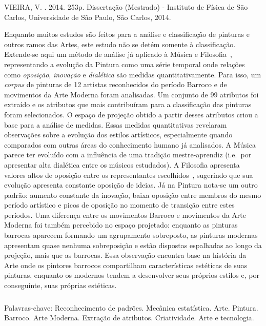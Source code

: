 \begin{resumo2}
\vspace{-10mm}
VIEIRA, V. \textbf{\ABNTtitulodata}. 2014. 253p. Dissertação (Mestrado) - Instituto de Física de São Carlos, Universidade de São Paulo, São Carlos, 2014.
\vspace{15mm}

Enquanto muitos estudos são feitos para a análise e classificação de
pinturas e outros ramos das Artes, este estudo não se detém somente à
classificação. Extende-se aqui um método de análise já aplicado à
Música e Filosofia~\cite{vieira}, representando a evolução da Pintura
como uma série temporal onde relações como \textit{oposição},
\textit{inovação} e \textit{dialética} são medidas
quantitativamente. Para isso, um \textit{corpus} de pinturas de 12
artistas reconhecidos do período Barroco e de movimentos da Arte
Moderna foram analisadas. Um conjunto de 99 atributos foi extraído e
os atributos que mais contribuíram para a classificação das pinturas
foram selecionados. O espaço de projeção obtido a partir desses
atributos criou a base para a análise de medidas. Essas medidas
quantitativas revelaram observações sobre a evolução dos estilos
artísticos, especialmente quando comparados com outras áreas do
conhecimento humano já analisados. A Música parece ter evoluído com a
influência de uma tradição mestre-aprendiz (i.e.\ por apresentar alta
dialética entre os músicos estudados). A Filosofia apresenta valores
altos de oposição entre os representantes escolhidos~\cite{vieira},
sugerindo que sua evolução apresenta constante oposição de ideias. Já
na Pintura nota-se um outro padrão: aumento constante da inovação,
baixa oposição entre membros do mesmo período artístico e picos de
oposição no momento de transição entre estes períodos. Uma diferença
entre os movimentos Barroco e movimentos da Arte Moderna foi também
percebido no espaço projetado: enquanto as pinturas barrocas aparecem
formando um agrupamento sobreposto, as pinturas modernas apresentam
quase nenhuma sobreposição e estão dispostas espalhadas ao longo da
projeção, mais que as barrocas. Essa observação encontra base na
história da Arte onde os pintores barrocos compartilham
características estéticas de suas pinturas, enquanto os modernos
tendem a desenvolver seus próprios estilos e, por conseguinte, suas
próprias estéticas.

$\phantom{linha em branco}$\\ Palavras-chave: Reconhecimento de
padrões. Mecânica estatística. Arte. Pintura. Barroco. Arte
Moderna. Extração de atributos. Criatividade. Arte e tecnologia.

\end{resumo2}


